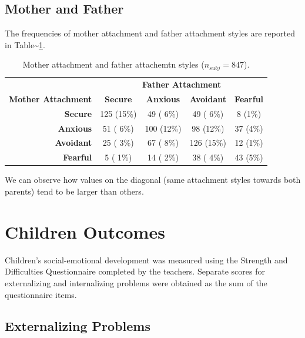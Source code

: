 \documentclass[
]{book}
\begin{document}
\hypertarget{mother-and-father}{%
\subsection{Mother and Father}\label{mother-and-father}}

The frequencies of mother attachment and father attachment styles are reported in Table\textasciitilde\ref{tab:table-cluster-mother-father}.

\begin{table}[!h]

\caption{\label{tab:table-cluster-mother-father}Mother attachment and father attachemtn styles ($n_{subj} = 847$).}
\centering
\begin{tabular}[t]{>{}rcccc}
\toprule
\multicolumn{1}{c}{\textbf{ }} & \multicolumn{4}{c}{\textbf{Father Attachment}} \\
\cmidrule(l{3pt}r{3pt}){2-5}
\textbf{Mother Attachment} & \textbf{Secure} & \textbf{Anxious} & \textbf{Avoidant} & \textbf{Fearful}\\
\midrule
\textbf{Secure} & 125 (15\%) & 49 ( 6\%) & 49 ( 6\%) & 8 (1\%)\\
\textbf{Anxious} & 51 ( 6\%) & 100 (12\%) & 98 (12\%) & 37 (4\%)\\
\textbf{Avoidant} & 25 ( 3\%) & 67 ( 8\%) & 126 (15\%) & 12 (1\%)\\
\textbf{Fearful} & 5 ( 1\%) & 14 ( 2\%) & 38 ( 4\%) & 43 (5\%)\\
\bottomrule
\end{tabular}
\end{table}

We can observe how values on the diagonal (same attachment styles towards both parents) tend to be larger than others.

\hypertarget{children-outcomes}{%
\section{Children Outcomes}\label{children-outcomes}}

Children's social-emotional development was measured using the Strength and Difficulties Questionnaire \citep[SDQ,][]{goodmanWhenUseBroader2010} completed by the teachers. Separate scores for externalizing and internalizing problems were obtained as the sum of the questionnaire items.

\hypertarget{externalizing-problems-1}{%
\subsection{Externalizing Problems}\label{externalizing-problems-1}}
\end{document}
